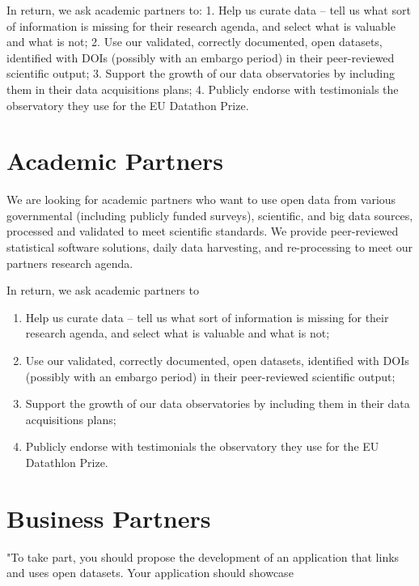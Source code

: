 \documentclass[
  a4paper,
  openany, a4paper, oneside]{book}
\providecommand{\tightlist}{%
  \setlength{\itemsep}{0pt}\setlength{\parskip}{0pt}}
\begin{document}
In return, we ask academic partners to:
1. Help us curate data -- tell us what sort of information is missing for their research agenda, and select what is valuable and what is not;
2. Use our validated, correctly documented, open datasets, identified with DOIs (possibly with an embargo period) in their peer-reviewed scientific output;
3. Support the growth of our data observatories by including them in their data acquisitions plans;
4. Publicly endorse with testimonials the observatory they use for the EU Datathon Prize.

\hypertarget{academic-partners}{%
\section{Academic Partners}\label{academic-partners}}

We are looking for academic partners who want to use open data from various governmental (including publicly funded surveys), scientific, and big data sources, processed and validated to meet scientific standards. We provide peer-reviewed statistical software solutions, daily data harvesting, and re-processing to meet our partners research agenda.

In return, we ask academic partners to

\begin{enumerate}
\def\labelenumi{\arabic{enumi}.}
\tightlist
\item
  Help us curate data -- tell us what sort of information is missing for their research agenda, and select what is valuable and what is not;
\item
  Use our validated, correctly documented, open datasets, identified with DOIs (possibly with an embargo period) in their peer-reviewed scientific output;
\item
  Support the growth of our data observatories by including them in their data acquisitions plans;
\item
  Publicly endorse with testimonials the observatory they use for the EU Datathlon Prize.
\end{enumerate}

\hypertarget{business-partners}{%
\section{Business Partners}\label{business-partners}}

"To take part, you should propose the development of an application that links and uses open datasets. Your application should showcase
\end{document}
